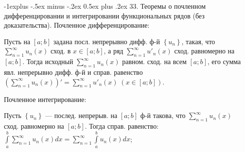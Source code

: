 \documentclass[unicode,10pt, landscape]{article}
\makeatletter
\renewcommand{\subsection}{\@startsection{subsection}{2}{0mm}%
                                {-1explus -.5ex minus -.2ex}%
                                {0.5ex plus .2ex}%
                                {\normalfont\normalsize\bfseries}}
\makeatother
\begin{document}
\begin{multicols}{4}

 \subsection{33. Теоремы о почленном дифференцировании и интегрировании функциональных рядов (без доказательства).}
 Почленное дифференцирование:
 \begin{Th}
  Пусть на $\left[a;b\right]$ задана посл. непрерывно дифф. ф-й $\left \{ u_{n} \right \}$, такая, что $\sum_{n=1}^{\infty }u_{n}(x)$ сход. в $x\in \left[a;b\right]$, а ряд $\sum_{n=1}^{\infty }u'_{n}(x)$ сход.  равномерно на $\left[a;b\right]$. Тогда исходный $\sum_{n=1}^{\infty }u_{n}(x)$ равном. сход. на всем $\left[a;b\right]$, его сумма явл. непрерывно дифф. ф-й и справ. равенство $\left ( \sum_{n=1}^{\infty }u_{n}(x) \right )'=\sum_{n=1}^{\infty }u'_{n}(x)\; (x\in \left[a;b\right])$.
 \end{Th}
 Почленное интегрирование:
 \begin{Th}
  Пусть $\left \{ u_{n} \right \}$ — послед. непрерыв. на $\left[a;b\right]$ ф-й такова, что $\sum_{n=1}^{\infty }u_{n}(x)$ сход. равномерно на $\left[a;b\right]$. Тогда справ. равенство: $\int\limits_{a}^{b}\sum_{n=1}^{\infty }u_{n}(x)dx=\sum_{n=1}^{\infty }\int\limits_{a}^{b}u_{n}(x)dx$;
 \end{Th}



\end{multicols}
\end{document}
